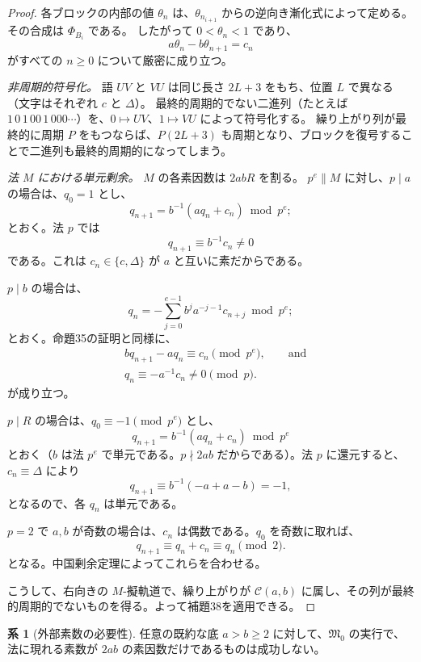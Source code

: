 \documentclass[11pt,reqno]{amsart}
\theoremstyle{definition}
\newtheorem{corollary}[theorem]{系}
\theoremstyle{definition}
\theoremstyle{remark}
\begin{document}
\begin{proof}
各ブロックの内部の値 \(\theta_n\) は、\(\theta_{n_{i+1}}\) からの逆向き漸化式によって定める。その合成は \(\Phi_{B_i}\) である。
したがって \(0<\theta_n<1\) であり、
\[
a\theta_n-b\theta_{n+1}=c_n
\]
がすべての \(n\ge0\) について厳密に成り立つ。

\emph{非周期的符号化。} 語 \(UV\) と \(VU\) は同じ長さ \(2L+3\) をもち、位置 \(L\) で異なる（文字はそれぞれ \(c\) と \(\Delta\)）。
最終的周期的でない二進列（たとえば \(1\,0\,1\,00\,1\,000\cdots\)）を、\(0\mapsto UV\)、\(1\mapsto VU\) によって符号化する。
繰り上がり列が最終的に周期 \(P\) をもつならば、\(P(2L+3)\) も周期となり、ブロックを復号することで二進列も最終的周期的になってしまう。

\emph{法 \(M\) における単元剰余。} \(M\) の各素因数は \(2abR\) を割る。
\(p^e\parallel M\) に対し、\(p\mid a\) の場合は、\(q_0=1\) とし、
\[
q_{n+1}=b^{-1}(aq_n+c_n)\bmod p^e;
\]
とおく。法 \(p\) では
\[
q_{n+1}\equiv b^{-1}c_n\ne0
\]
である。これは \(c_n\in\{c,\Delta\}\) が \(a\) と互いに素だからである。

\(p\mid b\) の場合は、
\[
q_n=-\sum_{j=0}^{e-1}b^ja^{-j-1}c_{n+j}\bmod p^e;
\]
とおく。命題35の証明と同様に、
\[
\begin{aligned}
&bq_{n+1}-aq_n\equiv c_n\pmod{p^e},\qquad\text{and}\\
&q_n\equiv-a^{-1}c_n\ne0\pmod p.
\end{aligned}
\]
が成り立つ。

\(p\mid R\) の場合は、\(q_0\equiv-1\pmod{p^e}\) とし、
\[
q_{n+1}=b^{-1}(aq_n+c_n)\bmod p^e
\]
とおく（\(b\) は法 \(p^e\) で単元である。\(p\nmid2ab\) だからである）。法 \(p\) に還元すると、\(c_n\equiv\Delta\) により
\[
q_{n+1}\equiv b^{-1}(-a+a-b)=-1,
\]
となるので、各 \(q_n\) は単元である。

\(p=2\) で \(a,b\) が奇数の場合は、\(c_n\) は偶数である。\(q_0\) を奇数に取れば、
\[
q_{n+1}\equiv q_n+c_n\equiv q_n\pmod2.
\]
となる。中国剰余定理によってこれらを合わせる。

こうして、右向きの \(M\)-擬軌道で、繰り上がりが \(\mathcal C(a,b)\) に属し、その列が最終的周期的でないものを得る。よって補題38を適用できる。\qedhere
\end{proof}

\begin{samepage}
\begin{corollary}[外部素数の必要性]\leavevmode\label{thm:43}
任意の既約な底 \(a>b\ge2\) に対して、\(\mathfrak M_0\) の実行で、法に現れる素数が \(2ab\) の素因数だけであるものは成功しない。
\label{thm-end:43}
\end{corollary}
\end{samepage}
\end{document}

